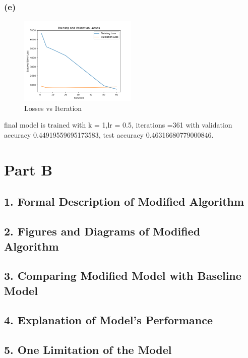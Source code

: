 \documentclass[12pt]{article}
\begin{document}
\subsubsection*{(e)}
\begin{figure}[h]
\centering
\includegraphics[width=0.5\textwidth]{losses vs iteration.png}
\caption{Losses vs Iteration}
\end{figure}
final model is trained with k = 1,lr = 0.5, iterations =361 with validation accuracy 0.44919559695173583, test accuracy 0.46316680779000846.\\

\newpage
\section*{Part B}
\subsection*{1. Formal Description of Modified Algorithm}

\subsection*{2. Figures and Diagrams of Modified Algorithm}

\subsection*{3. Comparing Modified Model with Baseline Model}

\subsection*{4. Explanation of Model's Performance}

\subsection*{5. One Limitation of the Model}
\end{document}
